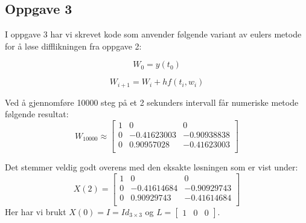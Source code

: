 \subsection{Oppgave 3}

I oppgave 3 har vi skrevet kode som anvender følgende variant av eulers metode for å løse difflikningen fra oppgave 2:

\begin{equation}
    W_0 = y(t_0)
\end{equation}

\begin{equation}
    W_{i+1} = W_i + hf(t_i, w_i)
\end{equation}

Ved å gjennomføre 10000 steg på et 2 sekunders intervall får numeriske metode følgende resultat:\newline
\begin{equation}
W_{10000} \approx    
\begin{bmatrix}
1 & 0 & 0\\
0 & -0.41623003 & -0.90938838\\
0 & 0.90957028 & -0.41623003\\
\end{bmatrix}
\end{equation}

Det stemmer veldig godt overens med den eksakte løsningen som er vist under:\newline
\begin{equation}
X(2) =     
\begin{bmatrix}
1 & 0 & 0\\
0 & -0.41614684 & -0.90929743\\
0 & 0.90929743 & -0.41614684\\
\end{bmatrix}
\end{equation}
Her har vi brukt $X(0)=I=Id_{3\times3}$ og $L=\begin{bmatrix}1&0&0\end{bmatrix}.$